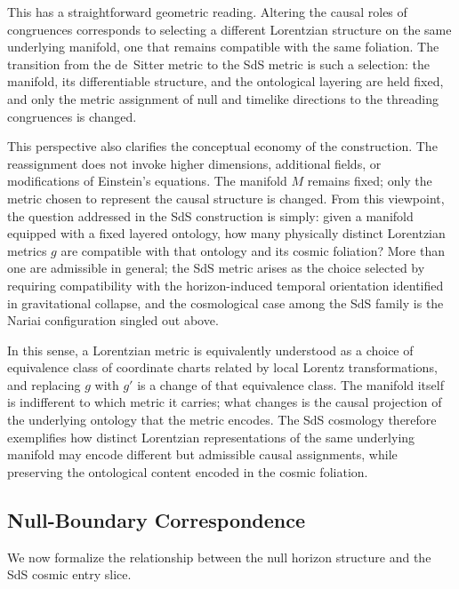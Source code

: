 \documentclass[11pt,a4paper]{article}
\theoremstyle{plain}
\theoremstyle{definition}
\theoremstyle{remark}
\begin{document}
This has a straightforward geometric reading. Altering the causal roles of congruences corresponds to selecting a different Lorentzian structure on the same underlying manifold, one that remains compatible with the same foliation. The transition from the de~Sitter metric to the SdS metric is such a selection: the manifold, its differentiable structure, and the ontological layering are held fixed, and only the metric assignment of null and timelike directions to the threading congruences is changed.

This perspective also clarifies the conceptual economy of the construction. The reassignment does not invoke higher dimensions, additional fields, or modifications of Einstein's equations. The manifold $M$ remains fixed; only the metric chosen to represent the causal structure is changed. From this viewpoint, the question addressed in the SdS construction is simply: given a manifold equipped with a fixed layered ontology, how many physically distinct Lorentzian metrics $g$ are compatible with that ontology and its cosmic foliation? More than one are admissible in general; the SdS metric arises as the choice selected by requiring compatibility with the horizon-induced temporal orientation identified in gravitational collapse, and the cosmological case among the SdS family is the Nariai configuration singled out above.

In this sense, a Lorentzian metric is equivalently understood as a choice of equivalence class of coordinate charts related by local Lorentz transformations, and replacing $g$ with $g'$ is a change of that equivalence class. The manifold itself is indifferent to which metric it carries; what changes is the causal projection of the underlying ontology that the metric encodes. The SdS cosmology therefore exemplifies how distinct Lorentzian representations of the same underlying manifold may encode different but admissible causal assignments, while preserving the ontological content encoded in the cosmic foliation.

\subsection{Null-Boundary Correspondence}

We now formalize the relationship between the null horizon structure and the SdS cosmic entry slice.
\end{document}
